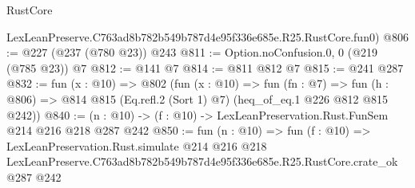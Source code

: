 \begin{lexlean}{RustCore}
\begin{coremodule}
    LexLeanPreserve.C763ad8b782b549b787d4e95f336e685e.R25.RustCore.fun0)
@806 := @227 (@237 (@780 @23)) @243
@811 := Option.noConfusion.{0, 0} (@219 (@785 @23)) @7
@812 := @141 @7
@814 := @811 @812 @7
@815 := @241 @287
@832 := fun (x : @10) =>
  @802
    (fun (x : @10) =>
    fun (fn : @7) =>
    fun (h : @806) => @814 @815 (Eq.refl.{2} (Sort 1) @7) (heq_of_eq.{1} @226 @812 @815 @242))
@840 := (n : @10) -> (f : @10) -> LexLeanPreservation.Rust.FunSem @214 @216 @218 @287 @242
@850 := fun (n : @10) =>
  fun (f : @10) =>
  LexLeanPreservation.Rust.simulate
    @214
    @216
    @218
    LexLeanPreserve.C763ad8b782b549b787d4e95f336e685e.R25.RustCore.crate_ok
    @287
    @242
\end{coremodule}
\end{lexlean}
